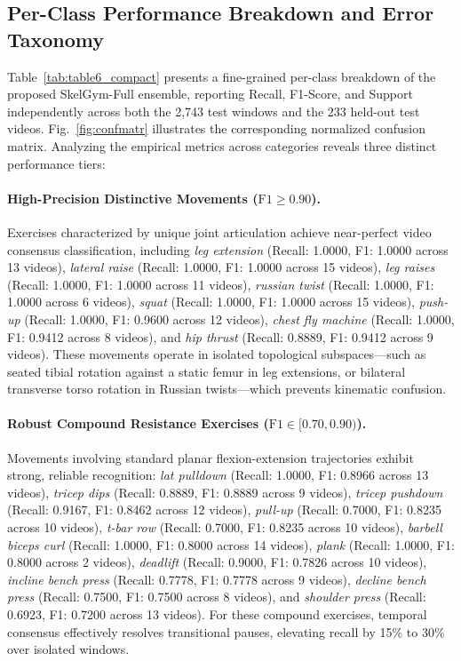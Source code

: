 \documentclass[runningheads]{llncs}
\begin{document}
\subsection{Per-Class Performance Breakdown and Error Taxonomy}
Table~\ref{tab:table6_compact} presents a fine-grained per-class breakdown of the proposed SkelGym-Full ensemble, reporting Recall, F1-Score, and Support independently across both the 2,743 test windows and the 233 held-out test videos. Fig.~\ref{fig:confmatr} illustrates the corresponding normalized confusion matrix. Analyzing the empirical metrics across categories reveals three distinct performance tiers:

\paragraph{High-Precision Distinctive Movements ($\text{F1} \ge 0.90$).} Exercises characterized by unique joint articulation achieve near-perfect video consensus classification, including \textit{leg extension} (Recall: 1.0000, F1: 1.0000 across 13 videos), \textit{lateral raise} (Recall: 1.0000, F1: 1.0000 across 15 videos), \textit{leg raises} (Recall: 1.0000, F1: 1.0000 across 11 videos), \textit{russian twist} (Recall: 1.0000, F1: 1.0000 across 6 videos), \textit{squat} (Recall: 1.0000, F1: 1.0000 across 15 videos), \textit{push-up} (Recall: 1.0000, F1: 0.9600 across 12 videos), \textit{chest fly machine} (Recall: 1.0000, F1: 0.9412 across 8 videos), and \textit{hip thrust} (Recall: 0.8889, F1: 0.9412 across 9 videos). These movements operate in isolated topological subspaces---such as seated tibial rotation against a static femur in leg extensions, or bilateral transverse torso rotation in Russian twists---which prevents kinematic confusion.

\paragraph{Robust Compound Resistance Exercises ($\text{F1} \in [0.70, 0.90)$).} Movements involving standard planar flexion-extension trajectories exhibit strong, reliable recognition: \textit{lat pulldown} (Recall: 1.0000, F1: 0.8966 across 13 videos), \textit{tricep dips} (Recall: 0.8889, F1: 0.8889 across 9 videos), \textit{tricep pushdown} (Recall: 0.9167, F1: 0.8462 across 12 videos), \textit{pull-up} (Recall: 0.7000, F1: 0.8235 across 10 videos), \textit{t-bar row} (Recall: 0.7000, F1: 0.8235 across 10 videos), \textit{barbell biceps curl} (Recall: 1.0000, F1: 0.8000 across 14 videos), \textit{plank} (Recall: 1.0000, F1: 0.8000 across 2 videos), \textit{deadlift} (Recall: 0.9000, F1: 0.7826 across 10 videos), \textit{incline bench press} (Recall: 0.7778, F1: 0.7778 across 9 videos), \textit{decline bench press} (Recall: 0.7500, F1: 0.7500 across 8 videos), and \textit{shoulder press} (Recall: 0.6923, F1: 0.7200 across 13 videos). For these compound exercises, temporal consensus effectively resolves transitional pauses, elevating recall by 15\% to 30\% over isolated windows.
\end{document}
